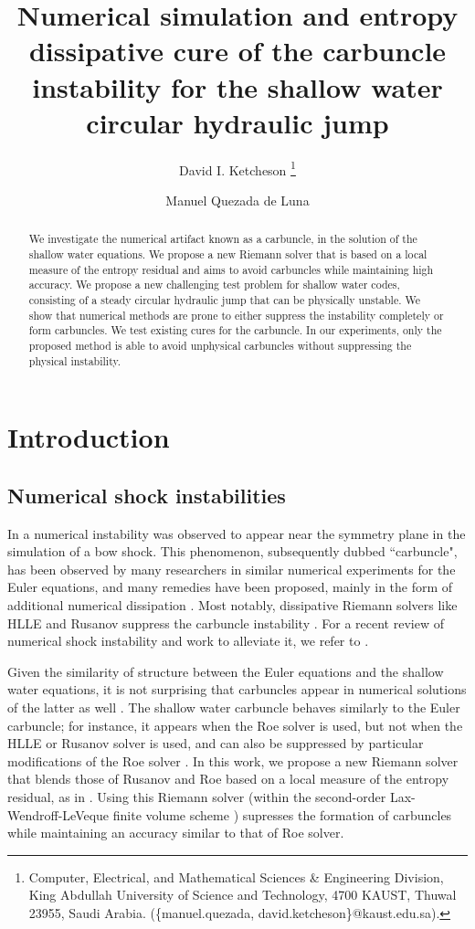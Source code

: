 \documentclass[preprint, 11pt]{article}
\title{Numerical simulation and entropy dissipative cure of the
  carbuncle instability for the shallow water circular hydraulic jump}
\author{
    David I. Ketcheson
  \thanks{
    Computer, Electrical, and Mathematical Sciences \& Engineering Division,
    King Abdullah University of Science and Technology, 4700 KAUST, Thuwal
    23955, Saudi Arabia. (\{manuel.quezada, david.ketcheson\}@kaust.edu.sa).
  }
    \and
    Manuel Quezada de Luna
  \footnotemark[1]
}
\begin{document}
\maketitle

\begin{abstract}
We investigate the numerical artifact known as a carbuncle, in the solution
of the shallow water equations.  We propose a new Riemann solver that is based
on a local measure of the entropy residual and aims to avoid carbuncles while
maintaining high accuracy.
We propose a new challenging test problem for shallow water codes, 
consisting of a steady circular hydraulic
jump that can be physically unstable.  We show that numerical methods are prone to
either suppress the instability completely or form carbuncles.
We test existing cures for the carbuncle. In our experiments, only the proposed
method is able to avoid unphysical carbuncles without suppressing the
physical instability.
\end{abstract}



\section{Introduction}

\subsection{Numerical shock instabilities}

In \cite{peery1988blunt} a numerical instability was observed to
appear near the symmetry plane in the simulation of a bow shock.
This phenomenon, subsequently dubbed ``carbuncle", has been observed by many researchers
in similar numerical experiments for the Euler equations, and many remedies
have been proposed, mainly in the form of additional numerical dissipation
\cite{quirk1997contribution,pandolfi2001numerical,dumbser2004matrix,chauvat2005shock,ismail2009proposed,shen2014stability}.
Most notably, dissipative Riemann solvers like HLLE and Rusanov suppress the carbuncle instability \cite{quirk1997contribution}.
For a recent review of numerical shock instability and work to alleviate it,
we refer to \cite[Section 2.5]{simonnumerical}.

Given the similarity of structure between the Euler equations and the shallow
water equations, it is not surprising that carbuncles appear in numerical
solutions of the latter as well \cite{kemm2014note}.
The shallow water carbuncle behaves similarly to the
Euler carbuncle; for instance, it appears when the Roe solver is used, but not when
the HLLE or Rusanov solver is used, and can also be suppressed by particular modifications
of the Roe solver \cite{kemm2014note,bader2014carbuncle}.
In this work, we propose a new Riemann solver that blends those of Rusanov and Roe
based on a local measure of the entropy residual, 
as in \cite{guermond2011entropy,guermond2018second,guermond2018well}.
Using this Riemann solver (within the second-order Lax-Wendroff-LeVeque 
finite volume scheme \cite{leveque1997wave, leveque2002finite}) supresses the formation of carbuncles 
while maintaining an accuracy similar to that of Roe solver.  
\end{document}
